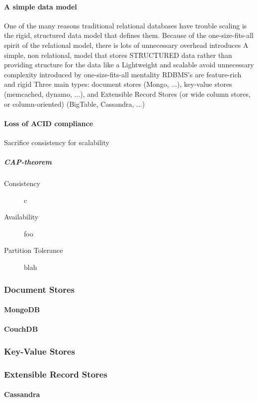 \documentclass[11pt,a4paper]{report}
\begin{document}
\paragraph{A simple data model}
One of the many reasons traditional relational databases have trouble scaling is the rigid, structured data model that defines them. Because of the one-size-fits-all spirit of the relational model, there is lots of unnecessary overhead  introduces A simple, non relational, model that stores STRUCTURED data rather than providing structure for the data like a 
Lightweight and scalable
avoid unnecessary complexity introduced by one-size-fits-all mentality
RDBMS's are feature-rich and rigid
Three main types: document stores (Mongo, ...), key-value stores (memcached, dynamo, ...), and Extensible Record Stores (or wide column stores, or column-oriented) (BigTable, Cassandra, ...)

\paragraph{Loss of ACID compliance}
Sacrifice consistency for scalability
\subparagraph{CAP-theorem}
\begin{description}
\item[Consistency] c
\item[Availability] foo
\item[Partition Tolerance] blah
\end{description}


\subsubsection*{Document Stores}
\paragraph*{MongoDB}
\paragraph*{CouchDB}
\subsubsection*{Key-Value Stores}
\subsubsection*{Extensible Record Stores}
\paragraph*{Cassandra}
\end{document}
